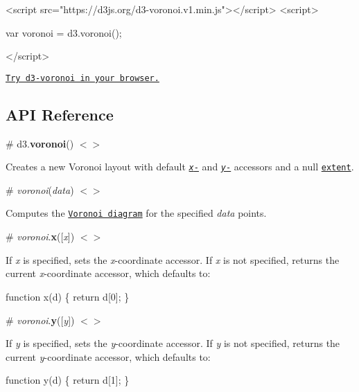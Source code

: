 \begin{DoxyCode}
<script src="https://d3js.org/d3-voronoi.v1.min.js"></script>
<script>

var voronoi = d3.voronoi();

</script>
\end{DoxyCode}


\href{https://tonicdev.com/npm/d3-voronoi}{\tt Try d3-\/voronoi in your browser.}

\subsection*{A\+PI Reference}

\label{_voronoi}%
\# d3.{\bfseries voronoi}() \href{https://github.com/d3/d3-voronoi/blob/master/src/voronoi.js}{\tt $<$$>$}

Creates a new Voronoi layout with default \href{#voronoi_x}{\tt {\itshape x}-\/} and \href{#voronoi_y}{\tt {\itshape y}-\/} accessors and a null \href{#voronoi_extent}{\tt extent}.

\label{__voronoi}%
\# {\itshape voronoi}({\itshape data}) \href{https://github.com/d3/d3-voronoi/blob/master/src/voronoi.js#L10}{\tt $<$$>$}

Computes the \href{#voronoi-diagrams}{\tt Voronoi diagram} for the specified {\itshape data} points.

\label{_voronoi_x}%
\# {\itshape voronoi}.{\bfseries x}(\mbox{[}{\itshape x}\mbox{]}) \href{https://github.com/d3/d3-voronoi/blob/master/src/voronoi.js#L31}{\tt $<$$>$}

If {\itshape x} is specified, sets the {\itshape x}-\/coordinate accessor. If {\itshape x} is not specified, returns the current {\itshape x}-\/coordinate accessor, which defaults to\+:


\begin{DoxyCode}
function x(d) \{
  return d[0];
\}
\end{DoxyCode}


\label{_voronoi_y}%
\# {\itshape voronoi}.{\bfseries y}(\mbox{[}{\itshape y}\mbox{]}) \href{https://github.com/d3/d3-voronoi/blob/master/src/voronoi.js#L35}{\tt $<$$>$}

If {\itshape y} is specified, sets the {\itshape y}-\/coordinate accessor. If {\itshape y} is not specified, returns the current {\itshape y}-\/coordinate accessor, which defaults to\+:


\begin{DoxyCode}
function y(d) \{
  return d[1];
\}
\end{DoxyCode}


